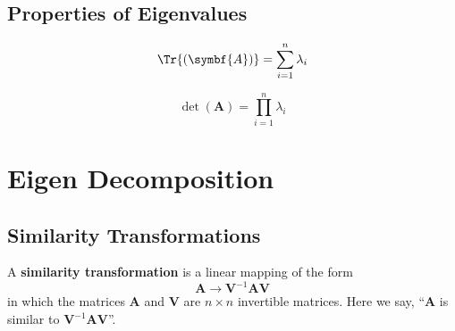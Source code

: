 \documentclass{article}
\begin{document}
\subsection{Properties of Eigenvalues}
\begin{theorem}
    \begin{equation*}
        \Tr{\left( \symbf{A} \right)} = \sum_{i=1}^n \lambda_i
    \end{equation*}
\end{theorem}
\begin{theorem}
    \begin{equation*}
        \det{\left( \symbf{A} \right)} = \prod_{i=1}^n \lambda_i
    \end{equation*}
\end{theorem}
\section{Eigen Decomposition}
\subsection{Similarity Transformations}
\begin{definition}
    A \textbf{similarity transformation} is a linear mapping of the form
    \begin{equation*}
        \symbf{A}\rightarrow \symbf{V}^{-1}\symbf{A}\symbf{V}
    \end{equation*}
    in which the matrices \(\symbf{A}\) and \(\symbf{V}\) are
    \(n \times n\) invertible matrices. Here we say, ``\(\symbf{A}\)
    is similar to \(\symbf{V}^{-1}\symbf{A}\symbf{V}\)''.
\end{definition}
\end{document}
